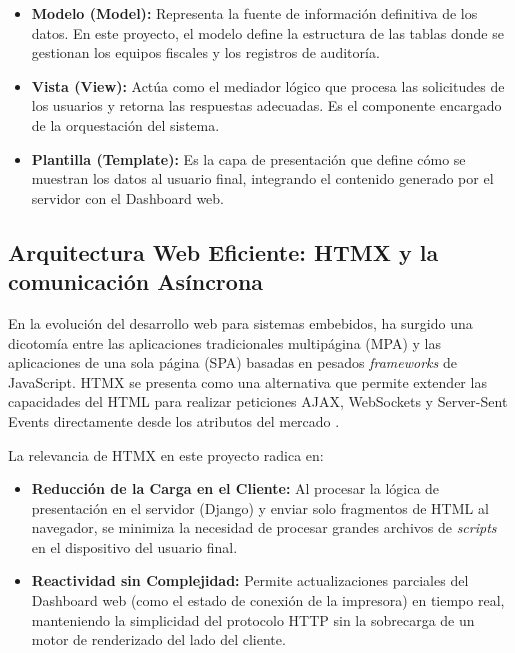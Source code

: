\begin{itemize}
    \item \textbf{Modelo (Model):} Representa la fuente de informaci\'on definitiva de los datos. En este proyecto, el modelo define la estructura de las tablas donde se gestionan los equipos fiscales y los registros de auditor\'ia.
    \item \textbf{Vista (View):} Act\'ua como el mediador l\'ogico que procesa las solicitudes de los usuarios y retorna las respuestas adecuadas. Es el componente encargado de la orquestaci\'on del sistema.
    \item \textbf{Plantilla (Template):} Es la capa de presentaci\'on que define c\'omo se muestran los datos al usuario final, integrando el contenido generado por el servidor con el Dashboard web.
\end{itemize}

\subsection{Arquitectura Web Eficiente: HTMX y la comunicación Asíncrona}

\par En la evolución del desarrollo web para sistemas embebidos, ha surgido una dicotomía entre las aplicaciones tradicionales multipágina (MPA) y las aplicaciones de una sola página (SPA) basadas en pesados \textit{frameworks} de JavaScript. HTMX se presenta como una alternativa que permite extender las capacidades del HTML para realizar peticiones AJAX, WebSockets y Server-Sent Events directamente desde los atributos del mercado \cite{HTMX_Doc}.\\

\par La relevancia de HTMX en este proyecto radica en:

\begin{itemize}
    \item \textbf{Reducción de la Carga en el Cliente:} Al procesar la lógica de presentación en el servidor (Django) y enviar solo fragmentos de HTML al navegador, se minimiza la necesidad de procesar grandes archivos de \textit{scripts} en el dispositivo del usuario final.
    \item \textbf{Reactividad sin Complejidad:} Permite actualizaciones parciales del Dashboard web (como el estado de conexión de la impresora) en tiempo real, manteniendo la simplicidad del protocolo HTTP sin la sobrecarga de un motor de renderizado del lado del cliente.
\end{itemize}


